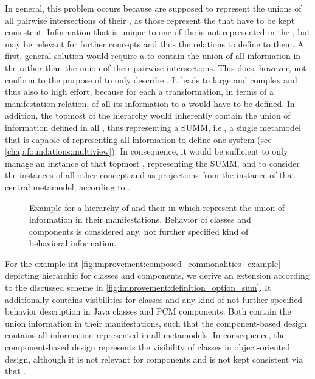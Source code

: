 In general, this problem occurs because \conceptmetamodels are supposed to represent the unions of all pairwise intersections of their \concretemetamodels, as those represent the \commonalities that have to be kept consistent.
Information that is unique to one of the \concretemetamodels is not represented in the \conceptmetamodel, but may be relevant for further concepts and thus the relations to define to them.
A first, general solution would require a \conceptmetamodel to contain the union of all information in the \concretemetamodels rather than the union of their pairwise intersections.
This does, however, not conform to the purpose of \conceptmetamodels to only describe \commonalities.
It leads to large and complex \conceptmetamodels and thus also to high effort, because for each \concretemetamodel a transformation, in terms of a manifestation relation, of all its information to a \conceptmetamodel would have to be defined.
In addition, the topmost \conceptmetamodel of the hierarchy would inherently contain the union of information defined in all \concretemetamodels, thus representing a \gls{SUMM}, i.e., a single metamodel that is capable of representing all information to define one system (see \autoref{chap:foundations:multiview}). %
In consequence, it would be sufficient to only manage an instance of that topmost \conceptmetamodel, representing the \gls{SUMM}, and to consider the instances of all other concept and \concretemetamodels as projections from the instance of that central metamodel, according to \textcite{atkinson2010a}.

\begin{figure}
    \centering
    
    \caption[\Commonalities with union of all information]{Example for a hierarchy of \conceptmetamodels and their \commonalities in which \conceptmetamodels represent the union of information in their manifestations. Behavior of classes and components is considered any, not further specified kind of behavioral information.}
    \label{fig:improvement:definition_option_sum}
\end{figure}

For the example int \autoref{fig:improvement:composed_commonalities_example} depicting hierarchic \conceptmetamodels for classes and components, we derive an extension according to the discussed scheme in \autoref{fig:improvement:definition_option_sum}.
It additionally contains visibilities for classes and any kind of not further specified behavior description in Java classes and \gls{PCM} components.
Both \conceptmetamodels contain the union information in their manifestations, such that the component-based design \conceptmetamodel contains all information represented in all metamodels.
In consequence, the component-based design \conceptmetamodel represents the visibility of classes in object-oriented design, although it is not relevant for components and is not kept consistent via that \conceptmetamodel.

